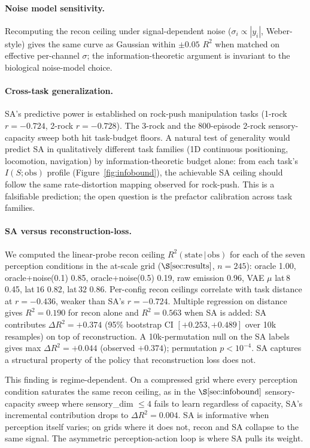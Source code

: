 \documentclass{article}
\begin{document}
\paragraph{Noise model sensitivity.}
Recomputing the recon ceiling under signal-dependent noise
($\sigma_i \propto |y_i|$, Weber-style) gives the same curve as Gaussian
within $\pm 0.05$ $R^2$ when matched on effective per-channel
$\sigma$; the information-theoretic argument is invariant to the
biological noise-model choice.

\paragraph{Cross-task generalization.}
SA's predictive power is established on rock-push manipulation tasks
(1-rock $r=-0.724$, 2-rock $r=-0.728$). The 3-rock and the 800-episode
2-rock sensory-capacity sweep both hit task-budget floors. A natural
test of generality would predict SA in qualitatively different task
families (1D continuous positioning, locomotion, navigation) by
information-theoretic budget alone: from each task's $I(S; \mathrm{obs})$
profile (Figure~\ref{fig:infobound}), the achievable SA ceiling should
follow the same rate-distortion mapping observed for rock-push. This is
a falsifiable prediction; the open question is the prefactor calibration
across task families.

\paragraph{SA versus reconstruction-loss.}
We computed the linear-probe recon ceiling
$R^2(\mathrm{state}\,\vert\,\mathrm{obs})$ for each of the seven perception
conditions in the at-scale grid ($\S\ref{sec:results}$, $n = 245$): oracle
1.00, oracle+noise(0.1) 0.85, oracle+noise(0.5) 0.19, raw emission 0.96,
VAE $\mu$ lat$\,8$ 0.45, lat$\,16$ 0.82, lat$\,32$ 0.86. Per-config recon
ceilings correlate with task distance at $r = -0.436$, weaker than SA's
$r = -0.724$. Multiple regression on distance gives $R^2 = 0.190$ for recon
alone and $R^2 = 0.563$ when SA is added: SA contributes $\Delta R^2 = +0.374$
(95\% bootstrap CI $[+0.253, +0.489]$ over 10k resamples) on top of
reconstruction. A 10k-permutation null on the SA labels gives max
$\Delta R^2 = +0.044$ (observed $+0.374$); permutation $p < 10^{-4}$. SA
captures a structural property of the policy that reconstruction loss does
not.

This finding is regime-dependent. On a compressed grid where every
perception condition saturates the same recon ceiling, as in the
$\S\ref{sec:infobound}$ sensory-capacity sweep where sensory\_dim
$\leq 4$ fails to learn regardless of capacity, SA's
incremental contribution drops to $\Delta R^2 = 0.004$. SA is informative
when perception itself varies; on grids where it does not, recon and SA
collapse to the same signal. The asymmetric perception-action loop is
where SA pulls its weight.
\end{document}

